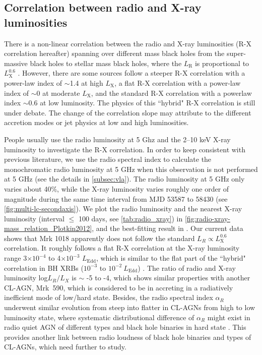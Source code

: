 \documentclass[twocolumn]{aastex63}
\begin{document}
\subsection{Correlation between radio and X-ray luminosities}
There is a non-linear correlation between the radio and X-ray luminosities (R-X correlation hereafter) spanning over different mass black holes from the super-massive black holes to stellar mass black holes, where the $L_\mathrm{R}$ is proportional to $L_\mathrm{X}^{0.6}$ \citep{2003MNRAS.345.1057M,2004A&A...414..895F}. However, there are some sources follow a steeper R-X correlation with a power-law index of $\sim$1.4 at high $L_\mathrm{X}$, a flat R-X correlation with a power-law index of  $\sim$0 at moderate $L_\mathrm{X}$, and the standard R-X correlation with a powerlaw index $\sim$0.6 \cite[e.g. ][]{2011MNRAS.414..677C,2016MNRAS.463.2287X} at low luminosity. The physics of this ``hybrid" R-X correlation is still under debate. The change of the correlation slope may attribute to the different accretion modes or jet physics at low and high luminosities\citep{2016MNRAS.456.4377X,2018MNRAS.481.4513I,2018MNRAS.473.4122E}. 

People usually use the radio luminosity at 5 Ghz and the 2--10 keV X-ray luminosity to investigate the R-X correlation. In order to keep consistent with previous literature, we use the radio spectral index to calculate the monochromatic radio luminosity at 5 GHz when this observation is not performed at 5 GHz (see the details in \autoref{subsec:vla}). The radio luminosity at 5 GHz only varies about 40\%, while the X-ray luminosity varies roughly one order of magnitude during the same time interval from MJD 53587 to 58430 (see \autoref{fig:multi-lc-secondaxis}). We plot the radio luminosity and the nearest X-ray luminosity (interval $\le$ 100 days, see \autoref{tab:radio_xray}) in \autoref{fig:radio-xray-mass_relation_Plotkin2012}, and  the best-fitting result in \citet{2012MNRAS.419..267P}. Our current data shows that Mrk 1018 apparently does not follow the standard $L_{R}\propto L_\mathrm{X}^{0.6}$ correlation. It roughly follows a flat R-X correlation at the X-ray luminosity range 3$\times 10^{-4}$ to 4$\times 10^{-3}$ $L_\mathrm{Edd}$, which is similar to the flat part of the ``hybrid" correlation in BH XRBs ($10^{-3}$ to $10^{-2}~L_\mathrm{Edd}$) \citep[see e.g. ][]{2018MNRAS.473.4122E,2020ApJ...891...31X}. The ratio of radio and X-ray luminosity log$L_R/L_X$ is $\sim$ -5 to -4, which shows similar properties with another CL-AGN, Mrk~590, which is considered to be in accreting in a radiatively inefficient mode of low/hard state\citep[see ][]{2016MNRAS.460..304K}.
Besides, the radio spectral index $\alpha_R$ underwent similar evolution from steep into flatter in CL-AGNs from high to low luminosity state, where systematic distributional difference of $\alpha_R$ might exist in radio quiet AGN of different types \citep[e.g.][]{2019MNRAS.485.3185C} and black hole binaries in hard state \citep[see][]{2018MNRAS.473.4122E}. This provides another link between radio loudness of black hole binaries and types of CL-AGNs, which need further to study.
\end{document}
